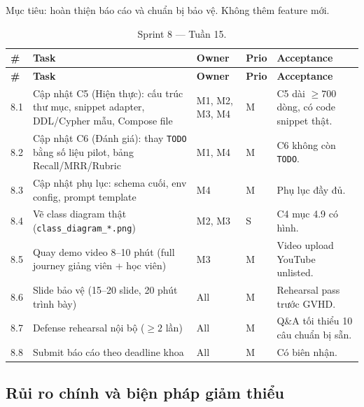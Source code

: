 Mục tiêu: hoàn thiện báo cáo và chuẩn bị bảo vệ. Không thêm feature mới.

\begin{longtable}{|p{0.7cm}|p{6.3cm}|p{1.2cm}|p{1cm}|p{3cm}|}
    \caption{Sprint 8 --- Tuần 15.}
    \label{tab:sprint8-gd2} \\
    \hline
    \textbf{\#} & \textbf{Task} & \textbf{Owner} & \textbf{Prio} & \textbf{Acceptance} \\
    \hline
    \endfirsthead
    \hline
    \textbf{\#} & \textbf{Task} & \textbf{Owner} & \textbf{Prio} & \textbf{Acceptance} \\
    \hline
    \endhead

    8.1 & Cập nhật C5 (Hiện thực): cấu trúc thư mục, snippet adapter, DDL/Cypher mẫu, Compose file & M1, M2, M3, M4 & M & C5 dài $\geq 700$ dòng, có code snippet thật. \\ \hline
    8.2 & Cập nhật C6 (Đánh giá): thay \texttt{TODO} bằng số liệu pilot, bảng Recall/MRR/Rubric & M1, M4 & M & C6 không còn \texttt{TODO}. \\ \hline
    8.3 & Cập nhật phụ lục: schema cuối, env config, prompt template & M4 & M & Phụ lục đầy đủ. \\ \hline
    8.4 & Vẽ class diagram thật (\texttt{class\_diagram\_*.png}) & M2, M3 & S & C4 mục 4.9 có hình. \\ \hline
    8.5 & Quay demo video 8--10 phút (full journey giảng viên + học viên) & M3 & M & Video upload YouTube unlisted. \\ \hline
    8.6 & Slide bảo vệ (15--20 slide, 20 phút trình bày) & All & M & Rehearsal pass trước GVHD. \\ \hline
    8.7 & Defense rehearsal nội bộ ($\geq 2$ lần) & All & M & Q\&A tối thiểu 10 câu chuẩn bị sẵn. \\ \hline
    8.8 & Submit báo cáo theo deadline khoa & All & M & Có biên nhận. \\ \hline
\end{longtable}

\subsection{Rủi ro chính và biện pháp giảm thiểu}
\label{subsec:risks-gd2}

